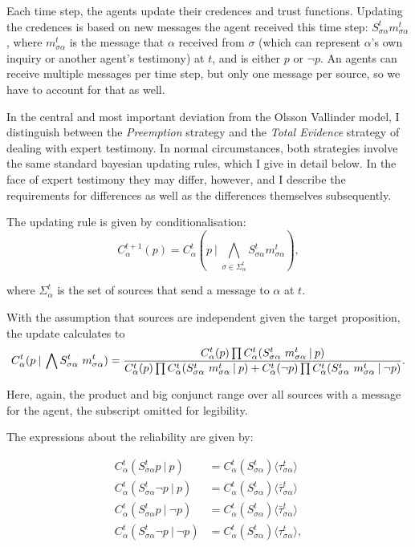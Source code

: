 \documentclass[11pt, a4paper]{article}
\newcommand{\Stsa}{S^t_{\sigma\alpha}}
\newcommand{\sa}{{\sigma\alpha}}
\newcommand{\given}[1][]{\:#1\vert\:}
\newcommand{\Sm}{\Stsa~m^t_{\sa}}
\renewcommand{\i}[1]{\emph{#1}}
\renewcommand{\a}{\alpha}
\begin{document}
Each time step, the agents update their credences and trust functions. Updating the credences is based on new messages the agent received this time step: $\Stsa m^t_{\sa}$, where $m^t_{\sa}$ is the message that $\alpha$ received from $\sigma$ (which can represent $\alpha$'s own inquiry or another agent's testimony) at $t$, and is either $p$ or $\neg p$. An agents can receive multiple messages per time step, but only one message per source, so we have to account for that as well. 

In the central and most important deviation from the Olsson Vallinder model, I distinguish between the \i{Preemption} strategy and the \i{Total Evidence} strategy of dealing with expert testimony. In normal circumstances, both strategies involve the same standard bayesian updating rules, which I give in detail below. In the face of expert testimony they may differ, however, and I describe the requirements for differences as well as the differences themselves subsequently. 

The updating rule is given by conditionalisation:
\[
    C^{t+1}_\alpha (p) = C^t_\alpha (p \given \bigwedge_{\sigma \in \Sigma^t_\alpha} \Stsa m^t_{\sa}),
\]

where $\Sigma^t_\alpha$ is the set of sources that send a message to $\alpha$ at $t$.

With the assumption that sources are independent given the target proposition, the update calculates to
\begin{equation}
    \label{eq:upd}
    C^t_\a (p \given \bigwedge \Sm) = \\
     \frac{C^t_\a (p) \prod C^t_\a (\Sm \given p) }
    {C^t_\a (p) \prod C^t_\a (\Sm \given p) +  C^t_\a (\neg p) \prod C^t_\a (\Sm \given \neg p) }.
\end{equation}

Here, again, the product and big conjunct range over all sources with a message for the agent, the subscript omitted for legibility.   

The expressions about the reliability are given by:

\begin{align*}
    C^t_\a (\Stsa p \given p) &= C^t_\a (\Stsa) \langle \tau^t_{\sa} \rangle \\
    C^t_\a (\Stsa \neg p \given p) &= C^t_\a (\Stsa) \langle \bar{\tau}^t_{\sa} \rangle \\
    C^t_\a (\Stsa p \given \neg p) &= C^t_\a (\Stsa) \langle \bar{\tau}^t_{\sa} \rangle \\
    C^t_\a (\Stsa \neg p \given \neg p) &= C^t_\a (\Stsa) \langle \tau^t_{\sa} \rangle,
\end{align*}
\end{document}
